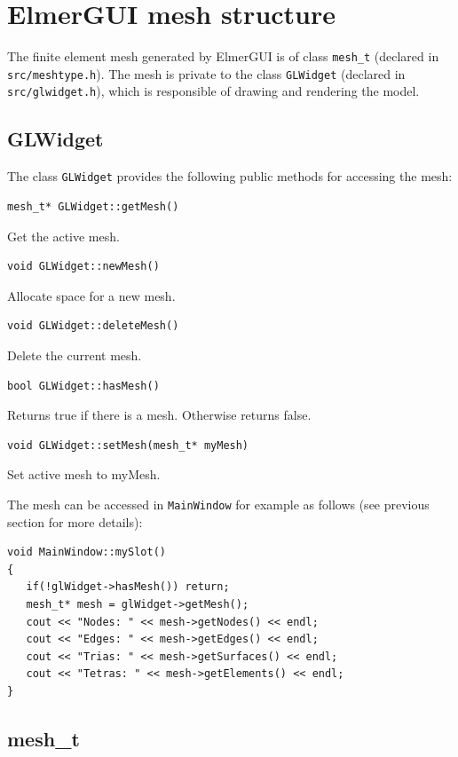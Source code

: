\newpage

\chapter{ElmerGUI mesh structure}

The finite element mesh generated by ElmerGUI is of class {\tt mesh\_t}
(declared in {\tt src/meshtype.h}). The mesh is private to the class {\tt GLWidget}
(declared in {\tt src/glwidget.h}), which is responsible of drawing and
rendering the model.

\section{GLWidget}

The class {\tt GLWidget} provides the following public methods for accessing the mesh:
\begin{verbatim}
mesh_t* GLWidget::getMesh()
\end{verbatim}
Get the active mesh.
\begin{verbatim}
void GLWidget::newMesh()
\end{verbatim}
Allocate space for a new mesh.
\begin{verbatim}
void GLWidget::deleteMesh()
\end{verbatim}
Delete the current mesh.
\begin{verbatim}
bool GLWidget::hasMesh()
\end{verbatim}
Returns true if there is a mesh. Otherwise returns false.
\begin{verbatim}
void GLWidget::setMesh(mesh_t* myMesh)
\end{verbatim}
Set active mesh to myMesh.

The mesh can be accessed in {\tt MainWindow} for example as follows
(see previous section for more details):
\begin{verbatim}
void MainWindow::mySlot()
{
   if(!glWidget->hasMesh()) return;
   mesh_t* mesh = glWidget->getMesh();
   cout << "Nodes: " << mesh->getNodes() << endl;
   cout << "Edges: " << mesh->getEdges() << endl;
   cout << "Trias: " << mesh->getSurfaces() << endl;
   cout << "Tetras: " << mesh->getElements() << endl;
}
\end{verbatim}

\section{mesh\_t}

